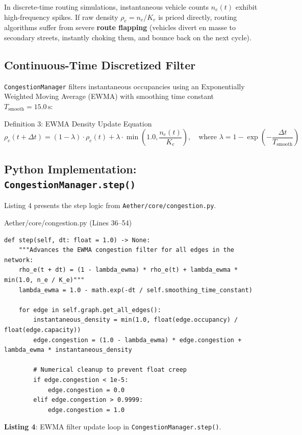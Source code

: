 \documentclass[10pt,a4paper]{article}
\begin{document}
In discrete-time routing simulations, instantaneous vehicle counts $n_e(t)$ exhibit high-frequency spikes. If raw density $\rho_e = n_e / K_e$ is priced directly, routing algorithms suffer from severe \textbf{route flapping} (vehicles divert en masse to secondary streets, instantly choking them, and bounce back on the next cycle).

\subsection{Continuous-Time Discretized Filter}
\texttt{CongestionManager} filters instantaneous occupancies using an Exponentially Weighted Moving Average (EWMA) with smoothing time constant $T_{\text{smooth}} = 15.0\,\text{s}$:

\begin{specbox}{Definition 3: EWMA Density Update Equation}
\begin{equation}
\rho_e(t + \Delta t) = (1 - \lambda) \cdot \rho_e(t) + \lambda \cdot \min\left(1.0, \frac{n_e(t)}{K_e}\right), \quad \text{where } \lambda = 1 - \exp\left(-\frac{\Delta t}{T_{\text{smooth}}}\right)
\label{eq:ewma}
\end{equation}
\end{specbox}

\subsection{Python Implementation: \texttt{CongestionManager.step()}}
Listing 4 presents the step logic from \texttt{Aether/core/congestion.py}.

\begin{codebox}{Aether/core/congestion.py (Lines 36--54)}
\begin{lstlisting}[style=AetherPython]
def step(self, dt: float = 1.0) -> None:
    """Advances the EWMA congestion filter for all edges in the network:
    rho_e(t + dt) = (1 - lambda_ewma) * rho_e(t) + lambda_ewma * min(1.0, n_e / K_e)"""
    lambda_ewma = 1.0 - math.exp(-dt / self.smoothing_time_constant)

    for edge in self.graph.get_all_edges():
        instantaneous_density = min(1.0, float(edge.occupancy) / float(edge.capacity))
        edge.congestion = (1.0 - lambda_ewma) * edge.congestion + lambda_ewma * instantaneous_density

        # Numerical cleanup to prevent float creep
        if edge.congestion < 1e-5:
            edge.congestion = 0.0
        elif edge.congestion > 0.9999:
            edge.congestion = 1.0
\end{lstlisting}
\end{codebox}
\vspace{-3pt}
\begin{center}\sffamily\footnotesize\textbf{Listing 4}: EWMA filter update loop in \texttt{CongestionManager.step()}.\end{center}
\end{document}
